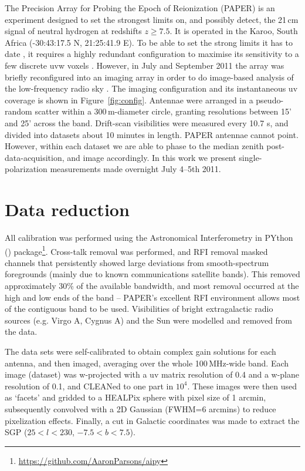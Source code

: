\documentclass[useAMS,usenatbib]{mn2e}
\begin{document}
The Precision Array for Probing the Epoch of Reionization (PAPER) is an experiment designed to set the strongest limits on, and possibly detect, the 21\,cm signal of neutral hydrogen at redshifts $z \geq 7.5$. It is operated in the Karoo, South Africa (-30:43:17.5 N, 21:25:41.9 E). To be able to set the strong limits it has to date \citep{Parsons.14, Jacobs.14, Ali.15, Moore.15}, it requires a highly redundant configuration to maximise its sensitivity to a few discrete uvw voxels \citep{Parsons.12}. However, in July and September 2011 the array was briefly reconfigured into an imaging array in order to do image-based analysis of the low-frequency radio sky \citep[e.g.][]{Jacobs.11, Stefan.13}. The imaging configuration and its instantaneous uv coverage is shown in Figure~\ref{fig:config}. Antennae were arranged in a pseudo-random scatter within a 300\,m-diameter circle, granting resolutions between 15' and 25' across the band.
Drift-scan visibilities were measured every 10.7 s, and divided into datasets about 10 minutes in length. PAPER antennae cannot point. However, within each dataset we are able to phase to the median zenith post-data-acquisition, and image accordingly. In this work we present single-polarization measurements made overnight July 4--5th 2011.

\section{Data reduction}
\label{sec:reduc}

All calibration was performed using the Astronomical Interferometry in PYthon ({}) package\footnote{\url{https://github.com/AaronParsons/aipy}}. Cross-talk removal was performed, and RFI removal masked channels that persistently showed large deviations from smooth-spectrum foregrounds (mainly due to known communications satellite bands). This removed approximately 30\% of the available bandwidth, and most removal occurred at the high and low ends of the band -- PAPER's excellent RFI environment allows most of the contiguous band to be used. Visibilities of bright extragalactic radio sources (e.g. Virgo A, Cygnus A) and the Sun were modelled and removed from the data. 


The data sets were self-calibrated to obtain complex gain solutions for each antenna, and then imaged, averaging over the whole 100\,MHz-wide band. Each image (dataset) was w-projected with a uv matrix resolution of 0.4 and a w-plane resolution of 0.1, and CLEANed \citep{Clark.80} to one part in $10^4$. These images were then used as `facets' and gridded to a HEALPix \citep{Gorski.05, Gorski.11} sphere with pixel size of 1 arcmin, subsequently convolved with a 2D Gaussian (FWHM=6 arcmins) to reduce pixelization effects. Finally, a cut in Galactic coordinates was made to extract the SGP ($25<l<230$, $-7.5<b<7.5$).
\end{document}
